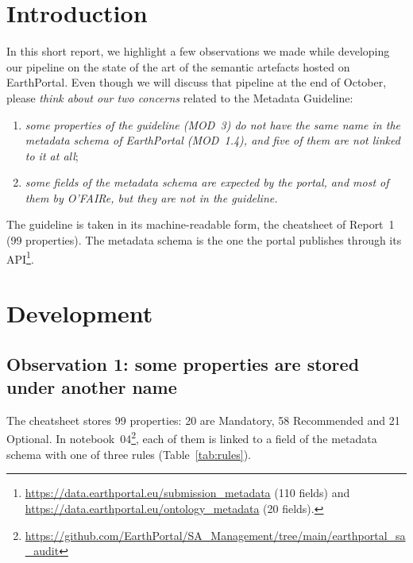 \documentclass[11pt,a4paper]{article}
\begin{document}
\makereporttitlepage

\section{Introduction}

In this short report, we highlight a few observations we made while developing our pipeline on
the state of the art of the semantic artefacts hosted on EarthPortal. Even though we will discuss
that pipeline at the end of October, please \textit{think about our two concerns} related to the Metadata
Guideline:
\begin{enumerate}
  \item \textit{some properties of the guideline (MOD~3) do not have the same name in the metadata schema of
    EarthPortal (MOD~1.4), and five of them are not linked to it at all};
  \item \textit{some fields of the metadata schema are expected by the portal, and most of them by
    O'FAIRe, but they are not in the guideline.}
\end{enumerate}

The guideline is taken in its machine-readable form, the cheatsheet of Report~1 (99 properties).
The metadata schema is the one the portal publishes through its API\footnote{%
\url{https://data.earthportal.eu/submission_metadata} (110 fields) and
\url{https://data.earthportal.eu/ontology_metadata} (20 fields).}. 

\section{Development}

\subsection{Observation 1: some properties are stored under another name}

The cheatsheet stores 99 properties: 20 are Mandatory, 58 Recommended and 21 Optional. In
notebook~04\footnote{\url{https://github.com/EarthPortal/SA_Management/tree/main/earthportal_sa_audit}}, 
each of them is linked to a field of the metadata schema with one of three rules
(Table~\ref{tab:rules}).
\end{document}
